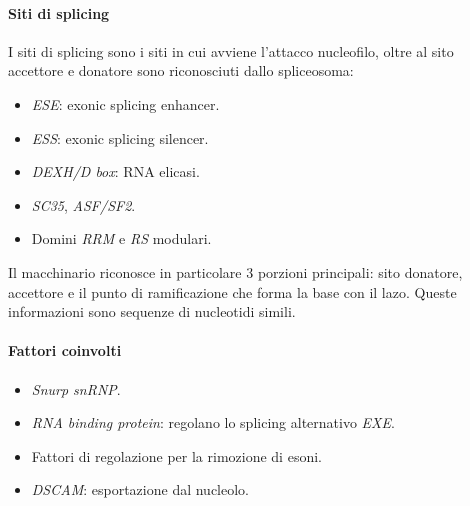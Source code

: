 			\paragraph{Siti di splicing}
			I siti di splicing sono i siti in cui avviene l'attacco nucleofilo, oltre al sito accettore e donatore sono riconosciuti dallo spliceosoma:
			\begin{multicols}{3}
				\begin{itemize}
					\item \emph{ESE}: exonic splicing enhancer.
					\item \emph{ESS}: exonic splicing silencer.
					\item \emph{DEXH/D box}: RNA elicasi.
					\item \emph{SC35}, \emph{ASF/SF2}.
					\item Domini \emph{RRM} e \emph{RS} modulari.
				\end{itemize}
			\end{multicols}
			Il macchinario riconosce in particolare $3$ porzioni principali: sito donatore, accettore e il punto di ramificazione che forma la base con il lazo.
			Queste informazioni sono sequenze di nucleotidi simili.

			\paragraph{Fattori coinvolti}
			\begin{multicols}{2}
				\begin{itemize}
					\item \emph{Snurp snRNP}.
					\item \emph{RNA binding protein}: regolano lo splicing alternativo \emph{EXE}.
					\item Fattori di regolazione per la rimozione di esoni.
					\item \emph{DSCAM}: esportazione dal nucleolo.
				\end{itemize}
			\end{multicols}
			
